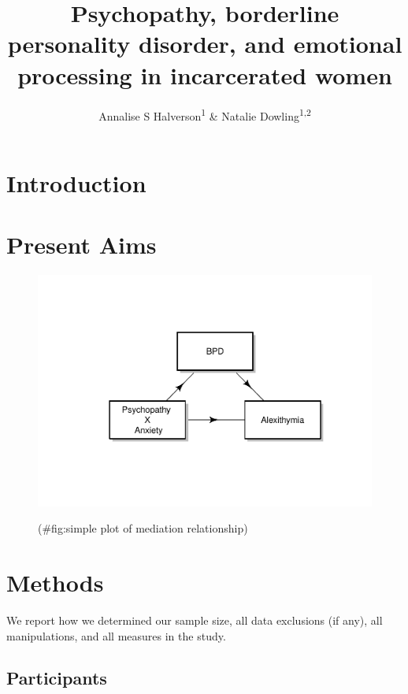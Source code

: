 \documentclass[
  man,floatsintext]{apa6}
\title{Psychopathy, borderline personality disorder, and emotional processing in incarcerated women}
\author{Annalise S Halverson\textsuperscript{1} \& Natalie Dowling\textsuperscript{1,2}}
\date{}
\affiliation{\vspace{0.5cm}\textsuperscript{1} University of Chicago\\\textsuperscript{2} Department of Psychology}
\begin{document}
\maketitle

\hypertarget{introduction}{%
\section{Introduction}\label{introduction}}

\hypertarget{present-aims}{%
\section{Present Aims}\label{present-aims}}

\begin{figure}
\includegraphics[width=1\linewidth]{d2m-Psychopathy_files/figure-latex/simple plot of mediation relationship-1} \caption{ }(\#fig:simple plot of mediation relationship)
\end{figure}

\hypertarget{methods}{%
\section{Methods}\label{methods}}

We report how we determined our sample size, all data exclusions (if any), all manipulations, and all measures in the study.

\hypertarget{participants}{%
\subsection{Participants}\label{participants}}
\end{document}
